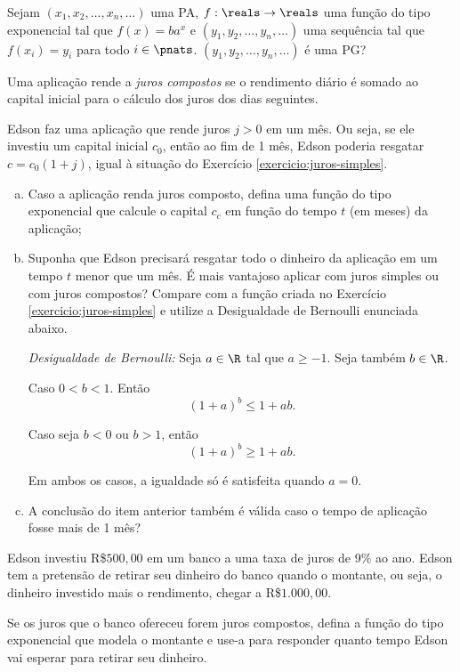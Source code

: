 \begin{exercise}
  Sejam $(x_1,x_2,\dots,x_n,\dots)$ uma PA, $f:\reals \to \reals$ uma função do 
  tipo exponencial tal que $f(x)=ba^x$ e $(y_1,y_2,\dots,y_n,\dots)$ uma sequência
  tal que $f(x_i)=y_i$ para todo $i\in\pnats$. $(y_1,y_2,\dots,y_n,\dots)$ é uma PG?
\end{exercise}

\begin{exercise}
    Uma aplicação rende a \emph{juros compostos} se o rendimento diário é somado ao capital inicial para o cálculo dos juros dos dias seguintes.
    
    Edson faz uma aplicação que rende juros $j>0$ em um mês. Ou seja, se ele investiu um capital inicial $c_0$, então ao fim de 1 mês, Edson poderia resgatar $c = c_0(1+j)$, igual à situação do Exercício \ref{exercicio:juros-simples}.
    \begin{enumerate}[a)]
        \item Caso a aplicação renda juros composto, defina uma função do tipo exponencial que calcule o capital $c_c$ em função do tempo $t$ (em meses) da aplicação;
        \item Suponha que Edson precisará resgatar todo o dinheiro da aplicação em um tempo $t$ menor que um mês. É mais vantajoso aplicar com juros simples ou com juros compostos? Compare com a função criada no Exercício \ref{exercicio:juros-simples} e utilize a Desigualdade de Bernoulli enunciada abaixo.

        \emph{Desigualdade de Bernoulli:}
        Seja $a \in \R$ tal que $a \geq -1$. Seja também $b \in \R$.
        
         Caso $0 < b < 1$. Então $$(1+a)^b \leq 1 + ab.$$
        
         Caso seja $b<0$ ou $b>1$, então $$(1+a)^b \geq 1 + ab.$$
        
         Em ambos os casos, a igualdade só é satisfeita quando $a=0$.
        \item A conclusão do item anterior também é válida caso o tempo de aplicação fosse mais de 1 mês?
\end{enumerate}
\end{exercise}

\begin{exercise}
    Edson investiu R\$$500{,}00$ em um banco a uma taxa de juros de 9\% ao ano. Edson tem a pretensão de retirar seu dinheiro do banco quando o montante, ou seja, o dinheiro investido mais o rendimento, chegar a R\$$1.000{,}00$.

Se os juros que o banco ofereceu forem juros compostos, defina a função do tipo exponencial que modela o montante e use-a para responder quanto tempo Edson vai esperar para retirar seu dinheiro.
\end{exercise}

